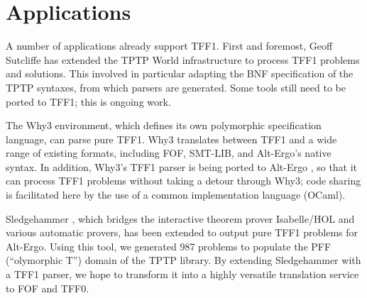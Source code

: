 \section{Applications}
\label{sec_apps}

A number of applications already support TFF1. First and foremost, Geoff
Sutcliffe has extended the TPTP World infrastructure to process TFF1 problems
and solutions. This involved in particular adapting the BNF specification of the
TPTP syntaxes, from which parsers are generated. Some tools still need to be
ported to TFF1; this is ongoing work.

The Why3 \cite{bobot-et-al-2011} environment, which defines its own polymorphic
specification language, can parse pure TFF1. Why3 translates
between TFF1 and a wide range of existing formats, including FOF, SMT-LIB, and
Alt-Ergo's native syntax. In addition, Why3's TFF1 parser is being ported to
Alt-Ergo \cite{bobot-et-al-2008}, so that it can process TFF1 problems without
taking a detour through Why3; code sharing is facilitated here by the use of
a common implementation language (OCaml).

Sledgehammer \cite{paulson-blanchette-2010}, which bridges the interactive
theorem prover Isabelle\slash HOL and various automatic provers, has been
extended to output pure TFF1 problems for Alt-Ergo. Using this tool, we
generated 987 problems to populate the PFF (``olymorphic T'')
domain of the TPTP library. By extending Sledgehammer with a TFF1 parser,
we hope to transform it into a highly versatile translation service to FOF and
TFF0.



